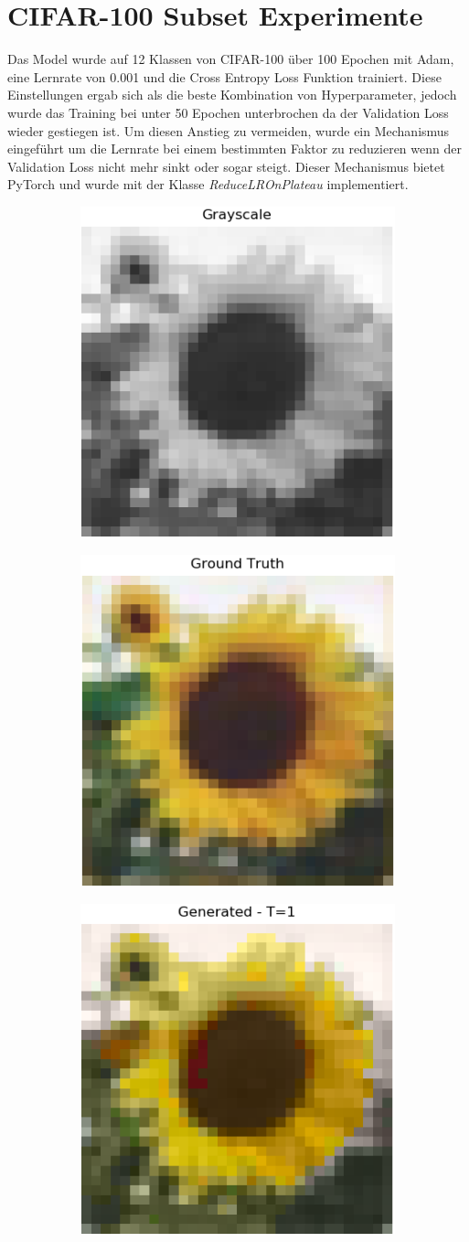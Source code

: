 \section{CIFAR-100 Subset Experimente}
Das Model wurde auf 12 Klassen von CIFAR-100 über 100 Epochen mit Adam, eine Lernrate von 0.001 und die Cross Entropy Loss Funktion
trainiert. Diese Einstellungen ergab sich als die beste Kombination von Hyperparameter, jedoch wurde das Training bei unter 50 Epochen unterbrochen
da der Validation Loss wieder gestiegen ist. Um diesen Anstieg zu vermeiden, wurde ein Mechanismus eingeführt um die Lernrate bei einem bestimmten
Faktor zu reduzieren wenn der Validation Loss nicht mehr sinkt oder sogar steigt. Dieser Mechanismus bietet PyTorch und wurde mit der 
Klasse \textit{ReduceLROnPlateau} implementiert.

\begin{figure}[H]
  \centering
  \vspace{1cm}
  \begin{subfigure}
    \centering
    \includegraphics[width=.24\textwidth]{resources/experiments/cifar/200_grayscale.png}
  \end{subfigure}
  \begin{subfigure}
    \centering
    \includegraphics[width=.24\textwidth]{resources/experiments/cifar/200_original.png}
  \end{subfigure}
  \begin{subfigure}
    \centering
    \includegraphics[width=.24\textwidth]{resources/experiments/cifar/200_t1.png}
  \end{subfigure}


\end{figure}
